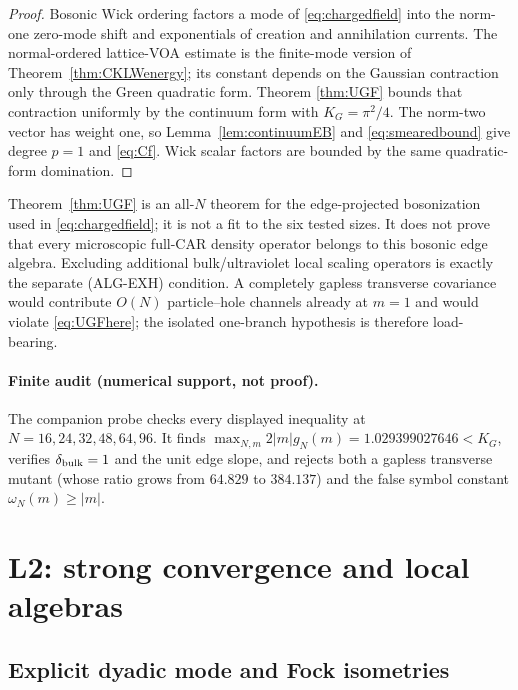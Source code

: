 \begin{proof}
Bosonic Wick ordering factors a mode of \eqref{eq:chargedfield} into the
norm-one zero-mode shift and exponentials of creation and annihilation
currents.  The normal-ordered lattice-VOA estimate is the finite-mode
version of Theorem~\ref{thm:CKLWenergy}; its constant depends on the
Gaussian contraction only through the Green quadratic form.  Theorem
\ref{thm:UGF} bounds that contraction uniformly by the continuum form
with $K_G=\pi^2/4$.  The norm-two vector has weight one, so
Lemma~\ref{lem:continuumEB} and \eqref{eq:smearedbound} give degree
$p=1$ and \eqref{eq:Cf}.  Wick scalar factors are bounded by the same
quadratic-form domination.
\end{proof}

\begin{remark}
Theorem~\ref{thm:UGF} is an all-$N$ theorem for the edge-projected
bosonization used in \eqref{eq:chargedfield}; it is not a fit to the six
tested sizes.  It does not prove that every microscopic full-CAR density
operator belongs to this bosonic edge algebra.  Excluding additional
bulk/ultraviolet local scaling operators is exactly the separate
\textup{(ALG-EXH)} condition.  A completely gapless transverse covariance
would contribute $O(N)$ particle--hole channels already at $m=1$ and
would violate \eqref{eq:UGFhere}; the isolated one-branch hypothesis is
therefore load-bearing.
\end{remark}

\paragraph{Finite audit (numerical support, not proof).}
The companion probe
checks every displayed inequality at
$N=16,24,32,48,64,96$.  It finds
$\max_{N,m}2|m|g_N(m)=1.029399027646<K_G$, verifies
$\delta_{\rm bulk}=1$ and the unit edge slope, and rejects both a
gapless transverse mutant (whose ratio grows from $64.829$ to $384.137$)
and the false symbol constant $\omega_N(m)\ge|m|$.

\section{L2: strong convergence and local algebras}
\label{sec:L2}

\subsection{Explicit dyadic mode and Fock isometries}

